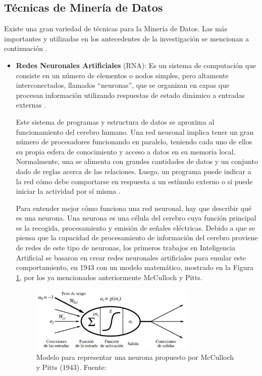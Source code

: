 \clearpage

\subsection{Técnicas de Minería de Datos}

Existe una gran variedad de técnicas para la Minería de Datos. Las más importantes y utilizadas en los antecedentes de la investigación se mencionan a continuación \parencite{gl_microsoft2018datamining}.

\begin{itemize}
	\item \textbf{Redes Neuronales Artificiales} (RNA): Es un sistema de computación que consiste en un número de elementos o nodos simples, pero altamente interconectados, llamados “neuronas”, que se organizan en capas que procesan información utilizando respuestas de estado dinámico a entradas externas \parencite{tec_inzaugarat2018ann}.
	
	Este sistema de programas y estructura de datos se aproxima al funcionamiento del cerebro humano. Una red neuronal implica tener un gran número de procesadores funcionando en paralelo, teniendo cada uno de ellos su propia esfera de conocimiento y acceso a datos en su memoria local. Normalmente, una se alimenta con grandes cantidades de datos y un conjunto dado de reglas acerca de las relaciones. Luego, un programa puede indicar a la red cómo debe comportarse en respuesta a un estímulo externo o si puede iniciar la actividad por sí misma \parencite{tec_banafa2019deeplearning}.
	
	Para entender mejor cómo funciona una red neuronal, hay que describir qué es una neurona. Una neurona es una célula del cerebro cuya función principal es la recogida, procesamiento y emisión de señales eléctricas. Debido a que se piensa que la capacidad de procesamiento de información del cerebro proviene de redes de este tipo de neuronas, los primeros trabajos en Inteligencia Artificial se basaron en crear redes neuronales artificiales para emular este comportamiento, en 1943 con un modelo matemático, mostrado en la Figura \ref{2:fig10}, por los ya mencionados anteriormente McCulloch y Pitts.
	\begin{figure}[h]
		\begin{center}
			\includegraphics[width=0.75\textwidth]{2/figures/rnn_mcculloch.jpg}
			\caption[Modelo para representar una neurona propuesto por McCulloch y Pitts (1943)]{Modelo para representar una neurona propuesto por McCulloch y Pitts (1943). Fuente: \cite{bk_russell2004intart}}
			\label{2:fig10}
		\end{center}
	\end{figure}


\end{itemize}
